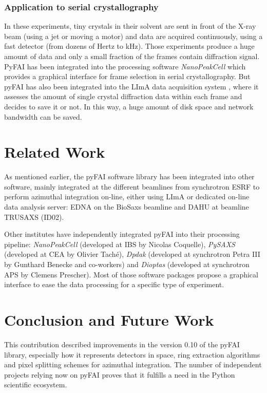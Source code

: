 \documentclass[preprint]{iucr}
\begin{document}
\subsubsection{Application to serial crystallography}
In these experiments, tiny crystals in their solvent are sent in
front of the X-ray beam (using a jet or moving a motor) and data are acquired
continuously, using a fast detector (from dozens of Hertz to kHz).
Those experiments produce a huge amount of data and only a small fraction of the
frames contain diffraction signal.
PyFAI has been integrated into the processing software \textit{NanoPeakCell}
which provides a graphical interface for frame selection in serial crystallography.
But pyFAI has also been integrated into the LImA data acquisition system
\cite{lima}, where it assesses the amount of single crystal
diffraction data within each frame and decides to save it or not.
In this way, a huge amount of disk space and network bandwidth
can be saved.

\section{Related Work}

As mentioned earlier, the pyFAI software library has been integrated
into other software, mainly integrated at the different beamlines from
synchrotron ESRF to perform azimuthal integration on-line, either using LImA or
dedicated on-line data analysis server: EDNA \cite{edna} on the
BioSaxs beamline \cite{bm29} and DAHU at beamline TRUSAXS (ID02).

Other institutes have independently integrated pyFAI into their processing
pipeline: \textit{NanoPeakCell} (developed at IBS by Nicolas Coquelle),
\textit{PySAXS} (developed at CEA by Olivier Taché), \textit{Dpdak} (developed
at synchrotron Petra III by Gunthard Benecke and co-workers) \cite{dpdak}
and \textit{Dioptas} (developed at synchrotron APS by Clemens Prescher).
Most of those software packages propose a graphical interface to ease the
data processing for a specific type of experiment.

\section{Conclusion and Future Work}

This contribution described improvements in the version 0.10 of the pyFAI
library, especially how it represents detectors in space, ring
extraction algorithms and pixel splitting schemes for azimuthal integration.
The number of independent projects relying now on pyFAI proves that it fulfills a
need in the Python scientific ecosystem.
\end{document}
